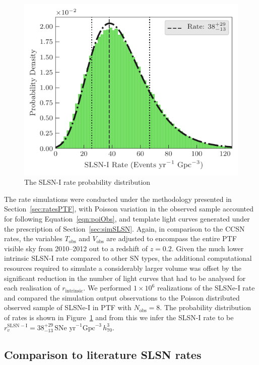 \documentclass[a4paper,fleqn,usenatbib]{mnras}
\begin{document}
\begin{figure}
	\includegraphics[width=\linewidth]{./SLSN_Rate_Dist.pdf}
    \caption{The SLSN-I rate probability distribution}
    \label{fig:SLSNrateProbDist}
\end{figure}

The rate simulations were conducted under the methodology presented in Section~\ref{sec:ratesPTF}, with Poisson variation in the observed sample accounted for following Equation~\ref{eqn:poiObs}, and template light curves generated under the prescription of Section~\ref{sec:simSLSN}. Again, in comparison to the CCSN rates, the variables $T_\mathrm{obs}$ and $V_\mathrm{obs}$ are adjusted to encompass the entire PTF visible sky from 2010--2012 out to a redshift of $z=0.2$. Given the much lower intrinsic SLSN-I rate compared to other SN types, the additional computational resources required to simulate a considerably larger volume was offset by the significant reduction in the number of light curves that had to be analysed for each realisation of $r_\mathrm{intrinsic}$. We performed $1\times10^6$ realizations of the SLSNe-I rate and compared the simulation output observations to the Poisson distributed observed sample of SLSNe-I in PTF with $N_\mathrm{obs}=8$. The probability distribution of rates is shown in Figure~\ref{fig:SLSNrateProbDist} and from this we infer the SLSN-I rate to be $r^\mathrm{SLSN-I}_v=38_{-13}^{+29}\, \text{SNe yr}^{-1}\text{Gpc}^{-3}\, h_{70}^{3}$.

\subsection{Comparison to literature SLSN rates}
\end{document}
